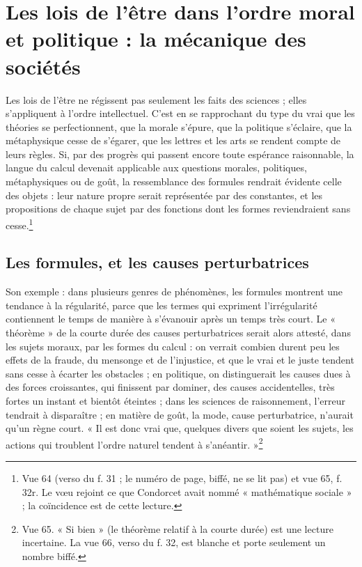 \documentclass[11pt,a4paper]{article}
\begin{document}
\section*{Les lois de l'être dans l'ordre moral et politique : la mécanique des sociétés}

Les lois de l'être ne régissent pas seulement les faits des sciences ; elles
s'appliquent à l'ordre intellectuel. C'est en se rapprochant du type du vrai que
les théories se perfectionnent, que la morale s'épure, que la politique
s'éclaire, que la métaphysique cesse de s'égarer, que les lettres et les arts se
rendent compte de leurs règles. Si, par des progrès qui passent encore toute
espérance raisonnable, la langue du calcul devenait applicable aux questions
morales, politiques, métaphysiques ou de goût, la ressemblance des formules
rendrait évidente celle des objets : leur nature propre serait représentée par
des constantes, et les propositions de chaque sujet par des fonctions dont les
formes reviendraient sans cesse.\footnote{Vue 64 (verso du f. 31 ; le numéro de
page, biffé, ne se lit pas) et vue 65, f. 32r. Le vœu
rejoint ce que Condorcet avait nommé « mathématique sociale » ; la coïncidence
est de cette lecture.}

\subsection*{Les formules, et les causes perturbatrices}

Son exemple : dans plusieurs genres de phénomènes, les formules montrent une
tendance à la régularité, parce que les termes qui expriment l'irrégularité
contiennent le temps de manière à s'évanouir après un temps très court. Le
« théorème » de la courte durée des causes perturbatrices serait alors attesté,
dans les sujets moraux, par les formes du calcul : on verrait combien durent peu
les effets de la fraude, du mensonge et de l'injustice, et que le vrai et le
juste tendent sans cesse à écarter les obstacles ; en politique, on
distinguerait les causes dues à des forces croissantes, qui finissent par
dominer, des causes accidentelles, très fortes un instant et bientôt éteintes ;
dans les sciences de raisonnement, l'erreur tendrait à disparaître ; en matière
de goût, la mode, cause perturbatrice, n'aurait qu'un règne court. « Il est
donc vrai que, quelques divers que soient les sujets, les actions qui troublent
l'ordre naturel tendent à s'anéantir. »\footnote{Vue 65. « Si bien » (le
théorème relatif à la courte durée) est une lecture incertaine. La vue 66, verso
du f. 32, est blanche et porte seulement un nombre biffé.}
\end{document}
